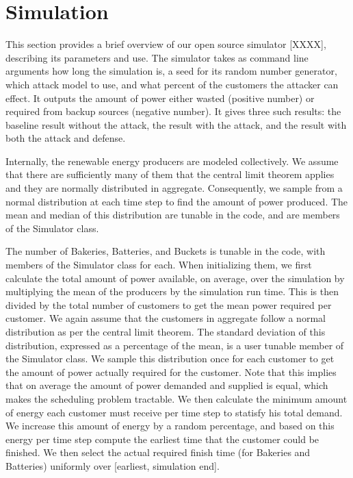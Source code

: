 \documentclass[conference]{IEEEtran}
\begin{document}
\section{Simulation}
\label{Simulation}

This section provides a brief overview of our open source simulator [XXXX], describing its parameters and use.  The simulator takes as command line arguments how long the simulation is, a seed for its random number generator, which attack model to use, and what percent of the customers the attacker can effect.  It outputs the amount of power either wasted (positive number) or required from backup sources (negative number).  It gives three such results: the baseline result without the attack, the result with the attack, and the result with both the attack and defense.

Internally, the renewable energy producers are modeled collectively.  We assume that there are sufficiently many of them that the central limit theorem applies and they are normally distributed in aggregate.  Consequently, we sample from a normal distribution at each time step to find the amount of power produced.  The mean and median of this distribution are tunable in the code, and are members of the Simulator class.

The number of Bakeries, Batteries, and Buckets is tunable in the code, with members of the Simulator class for each.  When initializing them, we first calculate the total amount of power available, on average, over the simulation by multiplying the mean of the producers by the simulation run time.  This is then divided by the total number of customers to get the mean power required per customer.  We again assume that the customers in aggregate follow a normal distribution as per the central limit theorem.  The standard deviation of this distribution, expressed as a percentage of the mean, is a user tunable member of the Simulator class.  We sample this distribution once for each customer to get the amount of power actually required for the customer.  Note that this implies that on average the amount of power demanded and supplied is equal, which makes the scheduling problem tractable.  We then calculate the minimum amount of energy each customer must receive per time step to statisfy his total demand. We increase this amount of energy by a random percentage, and based on this energy per time step compute the earliest time that the customer could be finished.   We then select the actual required finish time (for Bakeries and Batteries) uniformly over [earliest, simulation end].  
\end{document}
